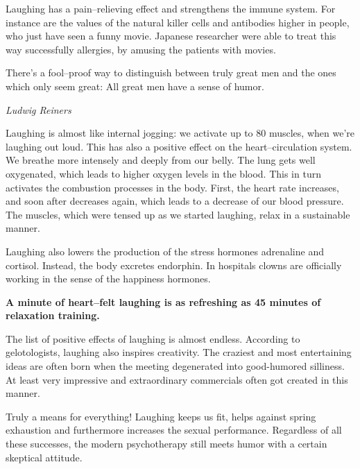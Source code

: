 \documentclass[../main.tex]{subfiles}
\begin{document}
Laughing has a pain--relieving effect and strengthens the immune system.
For instance are the values of the natural killer cells and antibodies higher in people,
who just have seen a funny movie.
Japanese researcher were able to treat this way successfully allergies, by amusing the patients with movies.

\epigraph{There's a fool--proof way to distinguish between truly great men and the ones which only seem great: All great men have a sense of humor.}{\textit{Ludwig Reiners}}

Laughing is almost like internal jogging: we activate up to 80 muscles, when we're laughing out loud.
This has also a positive effect on the heart--circulation system.
We breathe more intensely and deeply from our belly.
The lung gets well oxygenated, which leads to higher oxygen levels in the blood.
This in turn activates the combustion processes in the body.
First, the heart rate increases, and soon after decreases again, which leads to a decrease of our blood pressure.
The muscles, which were tensed up as we started laughing, relax in a sustainable manner.

Laughing also lowers the production of the stress hormones adrenaline and cortisol.
Instead, the body excretes endorphin.
In hospitals clowns are officially working in the sense of the happiness hormones.

\textbf{A minute of heart--felt laughing is as refreshing as 45 minutes of relaxation training.}

The list of positive effects of laughing is almost endless.
According to gelotologists, laughing also inspires creativity.
The craziest and most entertaining ideas are often born when the meeting degenerated into good-humored silliness.
At least very impressive and extraordinary commercials often got created in this manner.

Truly a means for everything!
Laughing keeps us fit, helps against spring exhaustion
and furthermore increases the sexual performance.
Regardless of all these successes, the modern psychotherapy still meets humor with a certain skeptical attitude.
\end{document}
